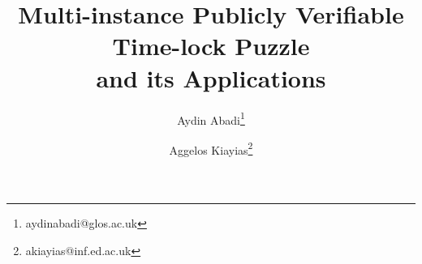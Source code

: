\documentclass[orivec]{llncs}
\begin{document}
  \setlength\abovedisplayskip{0pt}
  \setlength\belowdisplayskip{0pt}


\newenvironment{packed_item}{
\begin{itemize}
	\setlength{\topsep}{0pt}
	\setlength{\partopsep}{0pt}
  \setlength{\itemsep}{0pt}
  \setlength{\parskip}{0pt}
  \setlength{\parsep}{0pt}
}{\end{itemize}}

\newenvironment{packed_enum}{
\begin{enumerate}
	\setlength{\topsep}{0pt}
	\setlength{\partopsep}{0pt}
  \setlength{\itemsep}{0pt}
  \setlength{\parskip}{0pt}
  \setlength{\parsep}{0pt}
}{\end{enumerate}}





\title{Multi-instance Publicly Verifiable Time-lock Puzzle\\ and its Applications}
%
%

\author{%
Aydin Abadi\thanks{aydinabadi@glos.ac.uk} \and 
Aggelos Kiayias\thanks{akiayias@inf.ed.ac.uk}}





\maketitle              %
%
\end{document}
